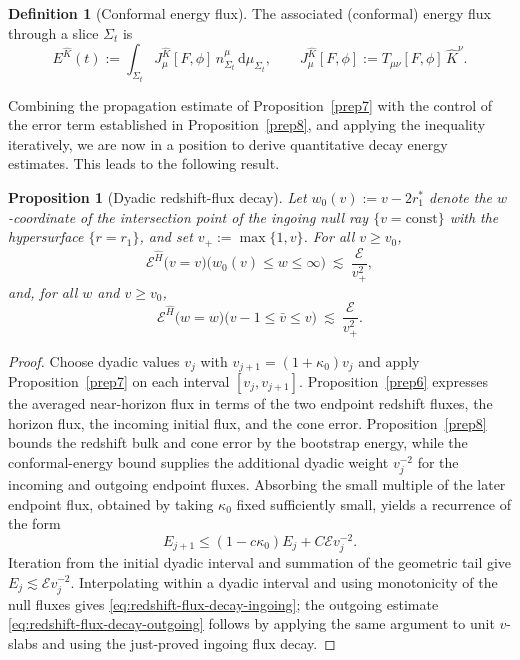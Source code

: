 \documentclass[11pt]{article}
\numberwithin{equation}{section}
\theoremstyle{plain}
\newtheorem{proposition}[theorem]{Proposition}
\theoremstyle{definition}
\newtheorem{definition}{Definition}[section]
\theoremstyle{remark}
\newcommand{\dd}{\mathrm{d}}
\begin{document}
\begin{definition}[Conformal energy flux]\label{def:morawetz-energy}
The associated (conformal) energy flux through a slice $\Sigma_t$ is
\begin{equation}\label{eq:EK-flux}
E^{\hat K}(t)
:=
\int_{\Sigma_t} J_\mu^{\hat K}[F,\phi]\,n_{\Sigma_t}^{\mu}\,\dd\mu_{\Sigma_t},
\qquad
J_\mu^{\hat K}[F,\phi]:=T_{\mu\nu}[F,\phi]\,\hat K^{\nu}.
\end{equation}
\end{definition}
Combining the propagation estimate of Proposition~\ref{prep7} with the control of the error term established in Proposition~\ref{prep8}, and applying the inequality iteratively, we are now in a position to derive quantitative decay energy estimates. This leads to the following result.
\begin{proposition}[Dyadic redshift-flux decay]\label{prep9}
Let $w_0(v):=v-2r_1^{\ast}$ denote the $w$-coordinate of the intersection point of the ingoing null ray $\{v=\mathrm{const}\}$ with the hypersurface $\{r=r_1\}$, and set $v_{+}:=\max\{1,v\}$.
For all $v\ge v_0$,
\begin{equation}\label{eq:redshift-flux-decay-ingoing}
\mathcal{E}^{\hat H}\bigl(v=v\bigr)\bigl(w_0(v)\le w\le \infty\bigr)\ \lesssim\ \frac{\mathcal{E}}{v_{+}^{2}},
\end{equation}
and, for all $w$ and $v\ge v_0$,
\begin{equation}\label{eq:redshift-flux-decay-outgoing}
\mathcal{E}^{\hat H}\bigl(w=w\bigr)\bigl(v-1\le \bar v\le v\bigr)\ \lesssim\ \frac{\mathcal{E}}{v_{+}^{2}}.
\end{equation}
\end{proposition}
\begin{proof}
Choose dyadic values $v_j$ with $v_{j+1}=(1+\kappa_0)v_j$ and apply Proposition~\ref{prep7} on each interval $[v_j,v_{j+1}]$.  Proposition~\ref{prep6} expresses the averaged near-horizon flux in terms of the two endpoint redshift fluxes, the horizon flux, the incoming initial flux, and the cone error.  Proposition~\ref{prep8} bounds the redshift bulk and cone error by the bootstrap energy, while the conformal-energy bound supplies the additional dyadic weight $v_j^{-2}$ for the incoming and outgoing endpoint fluxes.  Absorbing the small multiple of the later endpoint flux, obtained by taking $\kappa_0$ fixed sufficiently small, yields a recurrence of the form
\[
E_{j+1}\le (1-c\kappa_0)E_j+C\mathcal E v_j^{-2}.
\]
Iteration from the initial dyadic interval and summation of the geometric tail give $E_j\lesssim\mathcal E v_j^{-2}$.  Interpolating within a dyadic interval and using monotonicity of the null fluxes gives \eqref{eq:redshift-flux-decay-ingoing}; the outgoing estimate \eqref{eq:redshift-flux-decay-outgoing} follows by applying the same argument to unit $v$-slabs and using the just-proved ingoing flux decay.
\end{proof}
\end{document}

